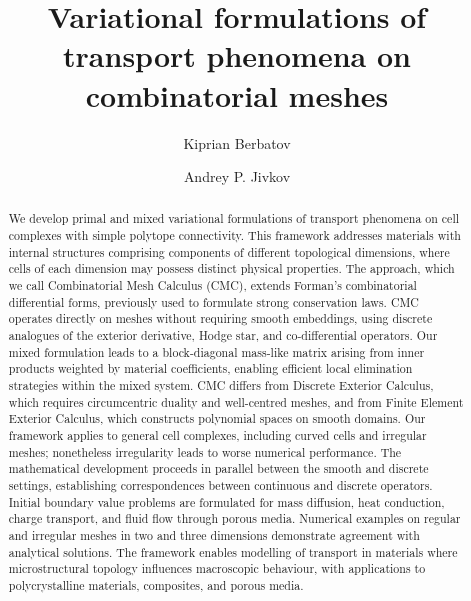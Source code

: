 \documentclass{elsarticle}
\theoremstyle{definition}
\begin{document}

\begin{frontmatter}

\title{Variational formulations of transport phenomena on combinatorial meshes}
\author[1]{Kiprian Berbatov}
\author[1]{Andrey P. Jivkov}
\address[1]{Department of Mechanical and Aerospace Engineering,
  The University of Manchester, Oxford Road, Manchester M13 9PL, UK}

\begin{abstract}
  We develop primal and mixed variational formulations of transport phenomena on
  cell complexes with simple polytope connectivity.
  This framework addresses materials with internal structures comprising
  components of different topological dimensions, where cells of each dimension
  may possess distinct physical properties.
  The approach, which we call Combinatorial Mesh Calculus (CMC), extends
  Forman's combinatorial differential forms, previously used to formulate strong
  conservation laws.
  CMC operates directly on meshes without requiring smooth
  embeddings, using discrete analogues of the exterior derivative, Hodge star,
  and co-differential operators.
  Our mixed formulation leads to a block-diagonal mass-like matrix arising
  from inner products weighted by material coefficients, enabling efficient
  local elimination strategies within the mixed system.
  CMC differs from Discrete Exterior Calculus, which requires circumcentric
  duality and well-centred meshes, and from Finite Element Exterior Calculus,
  which constructs polynomial spaces on smooth domains.
  Our framework applies to general cell complexes, including curved cells and
  irregular meshes; nonetheless irregularity leads to worse numerical
  performance.
  The mathematical development proceeds in parallel between the smooth and
  discrete settings, establishing correspondences between continuous and
  discrete operators.
  Initial boundary value problems are formulated for mass diffusion, heat
  conduction, charge transport, and fluid flow through porous media.
  Numerical examples on regular and irregular meshes in two and three dimensions
  demonstrate agreement with analytical solutions.
  The framework enables modelling of transport in materials where
  microstructural topology influences macroscopic behaviour, with applications
  to polycrystalline materials, composites, and porous media.
\end{abstract}


\end{frontmatter}
\end{document}
